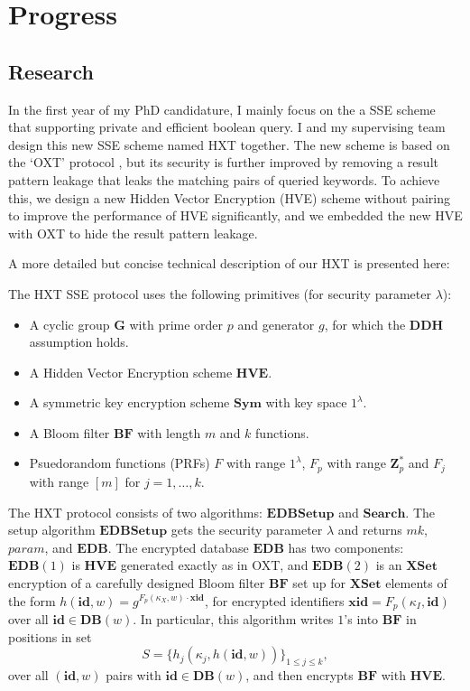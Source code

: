 \chapter{Progress}
\section{Research}
In the first year of my PhD candidature, I mainly focus on the a SSE scheme that supporting private and efficient boolean query. I and my supervising team design this new SSE scheme named HXT together. The new scheme is based on the `OXT' protocol \cite{cash2013highly}, but its security is further improved by removing a result pattern leakage that leaks the matching pairs of queried keywords. To achieve this, we design a new Hidden Vector Encryption (HVE) scheme without pairing to improve the performance of HVE significantly, and we embedded the new HVE with OXT to hide the result pattern leakage.

A more detailed but concise technical description of our HXT is presented here:

The HXT SSE protocol uses the following primitives (for security parameter $\lambda$):
\begin{itemize}
\setlength{\itemsep}{0pt}
\item A cyclic group $\mathbf{G}$ with prime order $p$ and generator $g$, for which the $\mathbf{DDH}$ assumption holds.
\item A Hidden Vector Encryption scheme $\mathbf{HVE}$.
\item A symmetric key encryption scheme $\mathbf{Sym}$ with key space $1^{\lambda}$.
\item A Bloom filter $\mathbf{BF}$ with length $m$ and $k$ functions.
\item Psuedorandom functions (PRFs) $F$ with range $1^{\lambda}$, $F_p$ with range $\mathbf{Z}^\ast_p$ and  $F_j$ with range $[m]$ for $j=1,\ldots,k$.
\end{itemize}

The HXT protocol consists of two algorithms: $\mathbf{EDBSetup}$ and $\mathbf{Search}$. 
The setup algorithm $\mathbf{EDBSetup}$ gets the security parameter $\lambda$ and returns $mk$, $param$, and $\mathbf{EDB}$. The encrypted database $\mathbf{EDB}$ has two components: $\mathbf{EDB}(1)$ is $\mathbf{HVE}$  generated exactly as in OXT, and $\mathbf{EDB}(2)$ is an $\mathbf{XSet}$ encryption of a carefully designed Bloom filter $\mathbf{BF}$ set up for $\mathbf{XSet}$ elements of the form $h (\mathbf{id}, w) = g^{F_p (\kappa_X, w ) \cdot \mathbf{xid}}$, for encrypted identifiers $\mathbf{xid}=F_p(\kappa_I,\mathbf{id})$ over all $\mathbf{id}\in\mathbf{DB}(w)$. In particular, this algorithm writes $1$'s into $\mathbf{BF}$ in positions in set 
$$S =\{h_j(\kappa_j,h(\mathbf{id},w))\}_{1\leq j \leq k},$$ 
over all $(\mathbf{id},w)$ pairs with $\mathbf{id}\in\mathbf{DB}(w)$, and then encrypts $\mathbf{BF}$ with $\mathbf{HVE}$.


